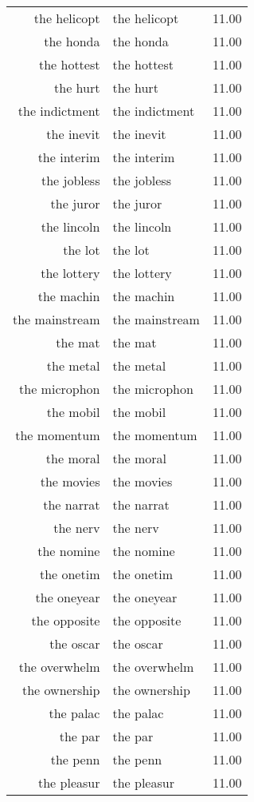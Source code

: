 \begin{table}[ht]
\begin{tabular}{rlr}
  the helicopt & the helicopt & 11.00 \\ 
  the honda & the honda & 11.00 \\ 
  the hottest & the hottest & 11.00 \\ 
  the hurt & the hurt & 11.00 \\ 
  the indictment & the indictment & 11.00 \\ 
  the inevit & the inevit & 11.00 \\ 
  the interim & the interim & 11.00 \\ 
  the jobless & the jobless & 11.00 \\ 
  the juror & the juror & 11.00 \\ 
  the lincoln & the lincoln & 11.00 \\ 
  the lot & the lot & 11.00 \\ 
  the lottery & the lottery & 11.00 \\ 
  the machin & the machin & 11.00 \\ 
  the mainstream & the mainstream & 11.00 \\ 
  the mat & the mat & 11.00 \\ 
  the metal & the metal & 11.00 \\ 
  the microphon & the microphon & 11.00 \\ 
  the mobil & the mobil & 11.00 \\ 
  the momentum & the momentum & 11.00 \\ 
  the moral & the moral & 11.00 \\ 
  the movies & the movies & 11.00 \\ 
  the narrat & the narrat & 11.00 \\ 
  the nerv & the nerv & 11.00 \\ 
  the nomine & the nomine & 11.00 \\ 
  the onetim & the onetim & 11.00 \\ 
  the oneyear & the oneyear & 11.00 \\ 
  the opposite & the opposite & 11.00 \\ 
  the oscar & the oscar & 11.00 \\ 
  the overwhelm & the overwhelm & 11.00 \\ 
  the ownership & the ownership & 11.00 \\ 
  the palac & the palac & 11.00 \\ 
  the par & the par & 11.00 \\ 
  the penn & the penn & 11.00 \\ 
  the pleasur & the pleasur & 11.00 \\ 

\end{tabular}
\end{table}
